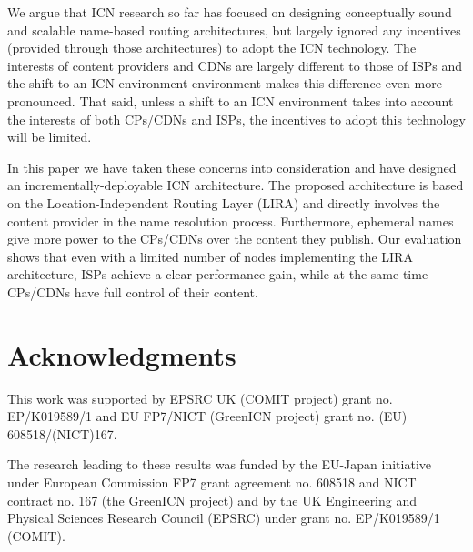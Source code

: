 \documentclass{sig-alternate}
\begin{document}
We argue that ICN research so far has focused on designing conceptually sound and scalable name-based routing architectures, but largely ignored any incentives (provided through those architectures) to adopt the ICN technology. The interests of content providers and CDNs are largely different to those of ISPs and the shift to an ICN environment environment makes this difference even more pronounced. That said, unless a shift to an ICN environment takes into account the interests of both CPs/CDNs and ISPs, the incentives to adopt this technology will be limited.

In this paper we have taken these concerns into consideration and have designed an incrementally-deployable ICN architecture. The proposed architecture is based on the Location-Independent Routing Layer (LIRA) and directly involves the content provider in the name resolution process. Furthermore, ephemeral names give more power to the CPs/CDNs over the content they publish. Our evaluation shows that even with a limited number of nodes implementing the LIRA architecture, ISPs achieve a clear performance gain, while at the same time CPs/CDNs have full control of their content.

\section{Acknowledgments}

This work was supported by EPSRC UK (COMIT project) grant no. EP/K019589/1 and EU FP7/NICT (GreenICN project) grant no. (EU) 608518/(NICT)167.

The research leading to these results was funded by the EU-Japan initiative under European Commission FP7 grant agreement no. 608518 and NICT contract no. 167 (the GreenICN project) and by the UK Engineering and Physical Sciences Research Council (EPSRC) under grant no. EP/K019589/1 (COMIT).
\end{document}

